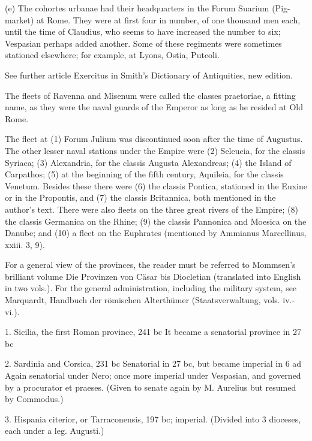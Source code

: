 (e) The cohortes urbanae had their headquarters in the Forum Suarium (Pig-market) at Rome. They were at first four in number, of one thousand men each, until the time of Claudius, who seems to have increased the number to six; Vespasian perhaps added another. Some of these regiments were sometimes stationed elsewhere; for example, at Lyons, Ostia, Puteoli.

See further article Exercitus in Smith\texthebrew{}’s Dictionary of Antiquities, new edition.


The fleets of Ravenna and Misenum were called the classes praetoriae, a fitting name, as they were the naval guards of the Emperor as long as he resided at Old Rome.

The fleet at (1) Forum Julium was discontinued soon after the time of Augustus. The other lesser naval stations under the Empire were (2) Seleucia, for the classis Syriaca; (3) Alexandria, for the classis Augusta Alexandreas; (4) the Island of Carpathos; (5) at the beginning of the fifth century, Aquileia, for the classis Venetum. Besides these there were (6) the classis Pontica, stationed in the Euxine or in the Propontis, and (7) the classis Britannica, both mentioned in the author\texthebrew{}’s text. There were also fleets on the three great rivers of the Empire; (8) the classis Germanica on the Rhine; (9) the classis Pannonica and Moesica on the Danube; and (10) a fleet on the Euphrates (mentioned by Ammianus Marcellinus, xxiii. 3, 9).


For a general view of the provinces, the reader must be referred to Mommsen\texthebrew{}’s brilliant volume Die Provinzen von Cäsar bis Diocletian (translated into English in two vols.). For the general administration, including the military system, see Marquardt, Handbuch der römischen Alterthümer (Staatsverwaltung, vols. iv.-vi.).

1. Sicilia, the first Roman province, 241 bc It became a senatorial province in 27 bc

2. Sardinia and Corsica, 231 bc Senatorial in 27 bc, but became imperial in 6 ad Again senatorial under Nero; once more imperial under Vespasian, and governed by a procurator et praeses. (Given to senate again by M. Aurelius but resumed by Commodus.)

3. Hispania citerior, or Tarraconensis, 197 bc; imperial. (Divided into 3 dioceses, each under a leg. Augusti.)


